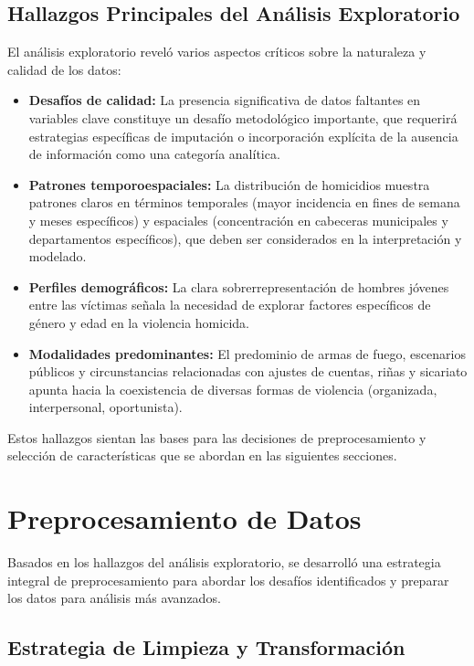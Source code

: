 \documentclass[lettersize,journal]{IEEEtran}
\begin{document}
\subsection{Hallazgos Principales del Análisis Exploratorio}
El análisis exploratorio reveló varios aspectos críticos sobre la naturaleza y calidad de los datos:
\begin{itemize}
\item \textbf{Desafíos de calidad:} La presencia significativa de datos faltantes en variables clave constituye un desafío metodológico importante, que requerirá estrategias específicas de imputación o incorporación explícita de la ausencia de información como una categoría analítica.
\item \textbf{Patrones temporoespaciales:} La distribución de homicidios muestra patrones claros en términos temporales (mayor incidencia en fines de semana y meses específicos) y espaciales (concentración en cabeceras municipales y departamentos específicos), que deben ser considerados en la interpretación y modelado.

\item \textbf{Perfiles demográficos:} La clara sobrerrepresentación de hombres jóvenes entre las víctimas señala la necesidad de explorar factores específicos de género y edad en la violencia homicida.

\item \textbf{Modalidades predominantes:} El predominio de armas de fuego, escenarios públicos y circunstancias relacionadas con ajustes de cuentas, riñas y sicariato apunta hacia la coexistencia de diversas formas de violencia (organizada, interpersonal, oportunista).

\end{itemize}
Estos hallazgos sientan las bases para las decisiones de preprocesamiento y selección de características que se abordan en las siguientes secciones.
\section{Preprocesamiento de Datos}
Basados en los hallazgos del análisis exploratorio, se desarrolló una estrategia integral de preprocesamiento para abordar los desafíos identificados y preparar los datos para análisis más avanzados.
\subsection{Estrategia de Limpieza y Transformación}
\end{document}
